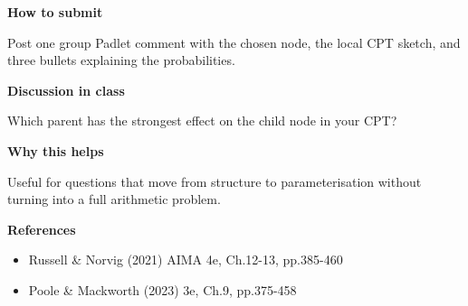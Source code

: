 \documentclass[11pt]{article}
\begin{document}
\begin{tcolorbox}[colback=white,colframe=MidnightBlue,title={Q4 Collaborative Mini-Case},fonttitle=\bfseries,breakable]
{\large\bfseries\color{MidnightBlue} How to submit}\par\medskip
Post one group Padlet comment with the chosen node, the local CPT sketch, and three bullets explaining the probabilities.

{\large\bfseries\color{MidnightBlue} Discussion in class}\par\medskip
Which parent has the strongest effect on the child node in your CPT?

{\large\bfseries\color{MidnightBlue} Why this helps}\par\medskip
Useful for questions that move from structure to parameterisation without turning into a full arithmetic problem.

{\large\bfseries\color{MidnightBlue} References}\par\medskip
\begin{itemize}\item Russell \& Norvig (2021) AIMA 4e, Ch.12-13, pp.385-460
\item Poole \& Mackworth (2023) 3e, Ch.9, pp.375-458\end{itemize}
\end{tcolorbox}
\end{document}
